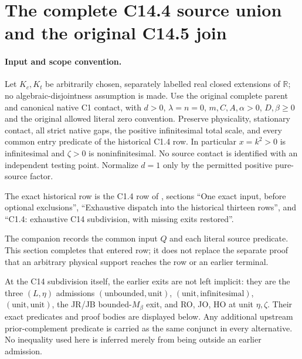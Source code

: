 \section{The complete C14.4 source union and the original C14.5 join}
\label{sec:fresh-c144-c145-join}

\paragraph{Input and scope convention.}
Let $K_c,K_t$ be arbitrarily chosen, separately labelled real closed
extensions of $\mathbb R$; no algebraic-disjointness assumption is made.
Use the original complete parent and canonical native C1 contact,
with $d>0$, $\lambda=n=0$, $m,C,A,\alpha>0$, $D,\beta\ge0$
and the original allowed literal zero convention.  Preserve physicality,
stationary contact, all strict native gaps, the positive infinitesimal
total scale, and every common entry predicate of the historical C1.4
row.  In particular $x=k^2>0$ is infinitesimal and
$\zeta>0$ is noninfinitesimal.  No source contact is identified with
an independent testing point.  Normalize $d=1$ only by the permitted
positive pure-source factor.

The exact historical row is the C1.4 row of
, sections
``One exact input, before optional exclusions'', ``Exhaustive dispatch
into the historical thirteen rows'', and ``C1.4: exhaustive C14
subdivision, with missing exits restored''.

The companion
 records the common input $Q$ and each
literal source predicate.  This section completes that entered row;
it does not replace the separate proof that an arbitrary physical
support reaches the row or an earlier terminal.

At the C14 subdivision itself, the earlier exits are not left
implicit: they are the three $(L,\eta)$ admissions
$(\text{unbounded},\text{unit})$,
$(\text{unit},\text{infinitesimal})$,
$(\text{unit},\text{unit})$, the JR/JB bounded-$M_\beta$ exit,
and RO, JO, HO at unit $\eta,\zeta$.  Their exact predicates and
proof bodies are displayed below.  Any additional upstream
prior-complement predicate is carried as the same conjunct in
every alternative.  No inequality used here is inferred merely
from being outside an earlier admission.

